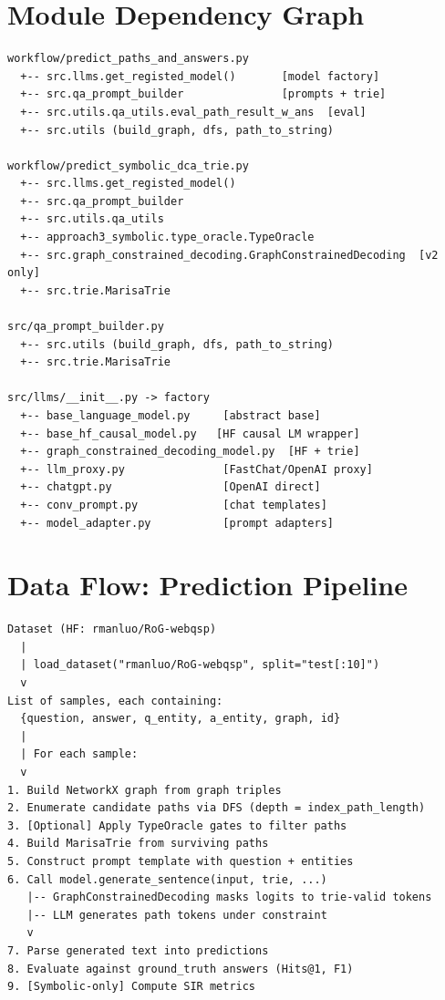 \documentclass[11pt,a4paper,oneside,openany]{book}
\theoremstyle{definition}
\begin{document}
\section{Module Dependency Graph}

\begin{verbatim}
workflow/predict_paths_and_answers.py
  +-- src.llms.get_registed_model()       [model factory]
  +-- src.qa_prompt_builder               [prompts + trie]
  +-- src.utils.qa_utils.eval_path_result_w_ans  [eval]
  +-- src.utils (build_graph, dfs, path_to_string)

workflow/predict_symbolic_dca_trie.py
  +-- src.llms.get_registed_model()
  +-- src.qa_prompt_builder
  +-- src.utils.qa_utils
  +-- approach3_symbolic.type_oracle.TypeOracle
  +-- src.graph_constrained_decoding.GraphConstrainedDecoding  [v2 only]
  +-- src.trie.MarisaTrie

src/qa_prompt_builder.py
  +-- src.utils (build_graph, dfs, path_to_string)
  +-- src.trie.MarisaTrie

src/llms/__init__.py -> factory
  +-- base_language_model.py     [abstract base]
  +-- base_hf_causal_model.py   [HF causal LM wrapper]
  +-- graph_constrained_decoding_model.py  [HF + trie]
  +-- llm_proxy.py               [FastChat/OpenAI proxy]
  +-- chatgpt.py                 [OpenAI direct]
  +-- conv_prompt.py             [chat templates]
  +-- model_adapter.py           [prompt adapters]
\end{verbatim}

\section{Data Flow: Prediction Pipeline}

\begin{verbatim}
Dataset (HF: rmanluo/RoG-webqsp)
  |
  | load_dataset("rmanluo/RoG-webqsp", split="test[:10]")
  v
List of samples, each containing:
  {question, answer, q_entity, a_entity, graph, id}
  |
  | For each sample:
  v
1. Build NetworkX graph from graph triples
2. Enumerate candidate paths via DFS (depth = index_path_length)
3. [Optional] Apply TypeOracle gates to filter paths
4. Build MarisaTrie from surviving paths
5. Construct prompt template with question + entities
6. Call model.generate_sentence(input, trie, ...)
   |-- GraphConstrainedDecoding masks logits to trie-valid tokens
   |-- LLM generates path tokens under constraint
   v
7. Parse generated text into predictions
8. Evaluate against ground_truth answers (Hits@1, F1)
9. [Symbolic-only] Compute SIR metrics
\end{verbatim}
\end{document}
